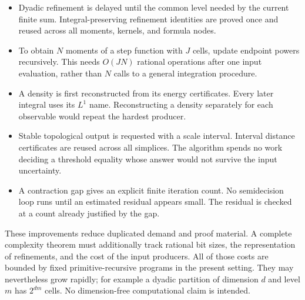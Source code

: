 \begin{itemize}
\item Dyadic refinement is delayed until the common level needed by
the current finite sum. Integral-preserving refinement identities are
proved once and reused across all moments, kernels, and formula nodes.
\item To obtain \(N\) moments of a step function with \(J\) cells,
update endpoint powers recursively. This needs \(O(JN)\) rational
operations after one input evaluation, rather than \(N\) calls to a
general integration procedure.
\item A density is first reconstructed from its energy certificates.
Every later integral uses its \(L^1\) name. Reconstructing a density
separately for each observable would repeat the hardest producer.
\item Stable topological output is requested with a scale interval.
Interval distance certificates are reused across all simplices.
The algorithm spends no work deciding a threshold equality whose
answer would not survive the input uncertainty.
\item A contraction gap gives an explicit finite iteration count.
No semidecision loop runs until an estimated residual appears small.
The residual is checked at a count already justified by the gap.
\end{itemize}

These improvements reduce duplicated demand and proof material. A
complete complexity theorem must additionally track rational bit sizes,
the representation of refinements, and the cost of the input producers.
All of those costs are bounded by fixed primitive-recursive programs
in the present setting. They may nevertheless grow rapidly; for
example a dyadic partition of dimension \(d\) and level \(m\) has
\(2^{dm}\) cells. No dimension-free computational claim is intended.
